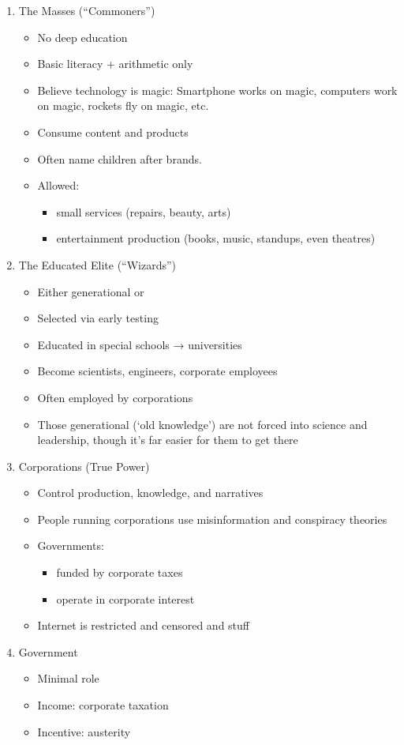 \documentclass[12pt]{article}
\begin{document}
\begin{enumerate}
  \item The Masses (“Commoners”)
  \begin{itemize}
    \item No deep education
    \item Basic literacy + arithmetic only
    \item Believe technology is magic: Smartphone works on magic, computers work on magic, rockets fly on magic, etc.
    \item Consume content and products
    \item Often name children after brands.
    \item Allowed:
    \begin{itemize}
      \item small services (repairs, beauty, arts)
      \item entertainment production (books, music, standups, even theatres)
    \end{itemize}
  \end{itemize}

  \item The Educated Elite (“Wizards”)
  \begin{itemize}
    \item Either generational or
    \item Selected via early testing
    \item Educated in special schools → universities
    \item Become scientists, engineers, corporate employees
    \item Often employed by corporations
    \item Those generational (‘old knowledge’) are not forced into science and leadership, though it’s far easier for them to get there
  \end{itemize}

  \item Corporations (True Power)
  \begin{itemize}
    \item Control production, knowledge, and narratives
    \item People running corporations use misinformation and conspiracy theories
    \item Governments:
    \begin{itemize}
      \item funded by corporate taxes
      \item operate in corporate interest
    \end{itemize}
    \item Internet is restricted and censored and stuff
  \end{itemize}

  \item Government
  \begin{itemize}
    \item Minimal role
    \item Income: corporate taxation
    \item Incentive: austerity
  \end{itemize}
\end{enumerate}
\end{document}

